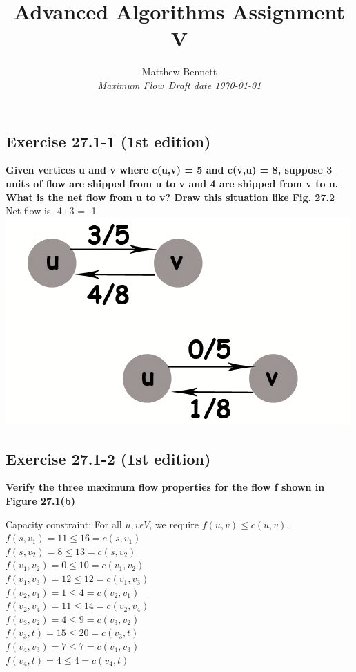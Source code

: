 \documentclass[10pt,fullpage]{article}
\title{ Advanced Algorithms Assignment V }
\author{Matthew Bennett \\
{\small\em Maximum Flow\ Draft date \today }}
\date{ }
\begin{document}
\maketitle

\subsection*{Exercise 27.1-1 (1st edition)}

\textbf{Given vertices u and v where c(u,v) = 5 and c(v,u) = 8,
suppose 3 units of flow are shipped from u to v and 4 are shipped
from v to u. What is the net flow from u to v?  Draw this situation
like Fig. 27.2}\\
Net flow is -4+3 = -1\\

\includegraphics[scale=0.5]{fig2702.png}

\subsection*{Exercise 27.1-2 (1st edition)}
\textbf{Verify the three maximum flow properties for the flow f
shown in Figure 27.1(b)}

Capacity constraint: For all $u, v \epsilon V$, we require $f(u,v)
\leq c(u,v)$.\\
\noindent
$f(s,v_1) = 11\leq 16 = c(s,v_1)$\\
$f(s,v_2) = 8\leq 13 = c(s,v_2)$\\
$f(v_1,v_2) = 0\leq 10 = c(v_1,v_2)$\\
$f(v_1,v_3) = 12\leq 12 = c(v_1,v_3)$\\
$f(v_2,v_1) = 1\leq 4 = c(v_2, v_1)$\\
$f(v_2,v_4) = 11\leq 14 = c(v_2,v_4)$\\
$f(v_3,v_2) = 4\leq 9 = c(v_3,v_2)$\\
$f(v_3,t) = 15\leq 20 = c(v_3,t)$\\
$f(v_4,v_3) = 7\leq 7 = c(v_4,v_3)$\\
$f(v_4,t) = 4\leq 4 = c(v_4,t)$\\
\end{document}
